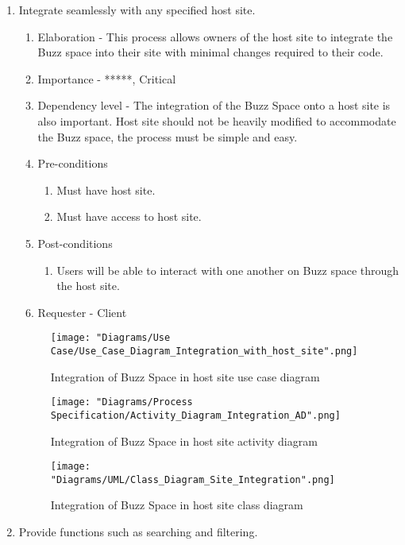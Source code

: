 \documentclass[12pt]{article}
\begin{document}
\begin{enumerate}
   \item Integrate seamlessly with any specified host site. %
	\begin{enumerate}
  		\item Elaboration - This process allows owners of the host site to integrate the Buzz space into their site with minimal changes required to their code.
   	 	\item Importance - *****, Critical
   	 	\item Dependency level - The integration of the Buzz Space onto a host site is also important. Host site should not be heavily modified to accommodate the Buzz space, the process must be simple and easy.
   	 	\item Pre-conditions
   		\begin{enumerate}
    		\item Must have host site.
    		\item Must have access to host site.
    	\end{enumerate}
     	\item Post-conditions
    	\begin{enumerate}
  	  		\item Users will be able to interact with one another on Buzz space through the host site.
   	 	\end{enumerate}
   	 	\item Requester - Client
	\end{enumerate}
  	\begin{figure}[h]
  		\centering
  		\texttt{[image: "Diagrams/Use Case/Use\_Case\_Diagram\_Integration\_with\_host\_site".png]}
  		\caption{Integration of Buzz Space in host site use case diagram}
  	\end{figure}
  	\begin{figure}[h]
  		\centering
  		\texttt{[image: "Diagrams/Process Specification/Activity\_Diagram\_Integration\_AD".png]}
  		\caption{Integration of Buzz Space in host site activity diagram}
  	\end{figure}
  	\begin{figure}[h]
  		\centering
  		\texttt{[image: "Diagrams/UML/Class\_Diagram\_Site\_Integration".png]}
  		\caption{Integration of Buzz Space in host site class diagram}
  	\end{figure}
  	\clearpage
  	\newpage
\item Provide functions such as searching and filtering. %
  \begin{enumerate}

\end{enumerate}
\end{enumerate}
\end{document}
